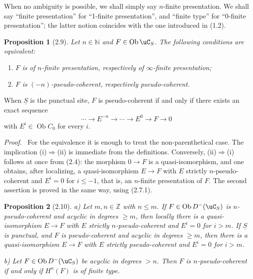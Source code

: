 \documentclass[11pt]{article}
\theoremstyle{plain}
\newtheorem*{proposition*}{Proposition}
\theoremstyle{definition}
\theoremstyle{remark}
\newenvironment{prooftext}{\par\noindent\textit{Proof.}\ }{\par\medskip}
\newcommand{\NN}{\mathbb N}
\newcommand{\ZZ}{\mathbb Z}
\DeclareMathOperator{\ob}{Ob}
\providecommand{\uS}{\underline{S}}
\begin{document}
When no ambiguity is possible, we shall simply say $n$-finite presentation. We shall say ``finite presentation'' for ``1-finite presentation'', and ``finite type'' for ``0-finite presentation''; the latter notion coincides with the one introduced in (1.2).

\begin{proposition*}[2.9]
Let $n\in\NN$ and $F\in\ob\uC_S$. The following conditions are equivalent:
\begin{enumerate}[label=(\roman*)]
\item $F$ is of $n$-finite presentation, respectively of $\infty$-finite presentation;
\item $F$ is $(-n)$-pseudo-coherent, respectively pseudo-coherent.
\end{enumerate}
\end{proposition*}

When $\uS$ is the punctual site, $F$ is pseudo-coherent if and only if there exists an exact sequence
\[
\cdots\longrightarrow E^{-n}\longrightarrow\cdots\longrightarrow E^0\longrightarrow F\longrightarrow0
\]
with $E^i\in\ob C_0$ for every $i$.

\begin{prooftext}
For the equivalence it is enough to treat the non-parenthetical case. The implication (i)$\Rightarrow$(ii) is immediate from the definitions. Conversely, (ii)$\Rightarrow$(i) follows at once from (2.4): the morphism $0\to F$ is a quasi-isomorphism, and one obtains, after localizing, a quasi-isomorphism $E\to F$ with $E$ strictly $n$-pseudo-coherent and $E^i=0$ for $i\leq -1$, that is, an $n$-finite presentation of $F$. The second assertion is proved in the same way, using (2.7.1).
\end{prooftext}

\begin{proposition*}[2.10]
\textup{a)} Let $m,n\in\ZZ$ with $n\leq m$. If $F\in\ob D^-(\uC_S)$ is $n$-pseudo-coherent and acyclic in degrees $\geq m$, then locally there is a quasi-isomorphism $E\to F$ with $E$ strictly $n$-pseudo-coherent and $E^i=0$ for $i>m$. If $\uS$ is punctual, and $F$ is pseudo-coherent and acyclic in degrees $\geq m$, then there is a quasi-isomorphism $E\to F$ with $E$ strictly pseudo-coherent and $E^i=0$ for $i>m$.

\textup{b)} Let $F\in\ob D^-(\uC_S)$ be acyclic in degrees $>n$. Then $F$ is $n$-pseudo-coherent if and only if $H^n(F)$ is of finite type.
\end{proposition*}
\end{document}
